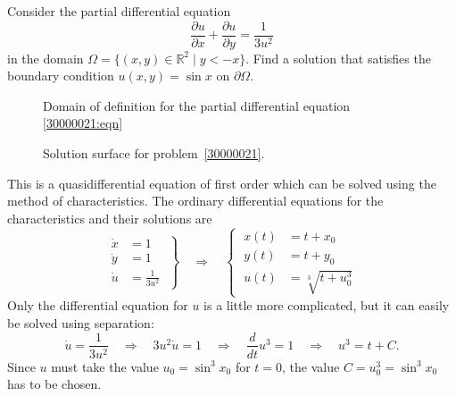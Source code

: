 Consider the partial differential equation
\begin{equation}
\frac{\partial u}{\partial x} + \frac{\partial u}{\partial y} = \frac{1}{3u^2}
\label{30000021:eqn}
\end{equation}
in the domain $\Omega = \{(x,y)\in\mathbb R^2\;|\; y<-x\}$. 
Find a solution that satisfies the boundary condition $u(x,y)=\sin x$ on
$\partial\Omega$.

\begin{loesung}
\begin{figure}
\centering
{}
\caption{Domain of definition for the partial differential equation
\eqref{30000021:eqn}
\label{3000021:domain}}
\end{figure}
\begin{figure}
\centering
{}
\caption{Solution surface for problem~\ref{30000021}.
\label{30000021:graph}}
\end{figure}
This is a quasidifferential equation of first order which can be solved
using the method of characteristics.
The ordinary differential equations for the characteristics and their
solutions are
\begin{equation}
\left.
\begin{aligned}
\dot x &= 1
\\
\dot y &= 1
\\
\dot u &= \frac1{3u^2}
\end{aligned}
\;
\right\}
\quad\Rightarrow\quad
\left\{
\;
\begin{aligned}
x(t) &= t + x_0
\\
y(t) &= t + y_0
\\
u(t) &=\sqrt[3]{t+u_0^3}
\end{aligned}
\right.
\label{30000020:char}
\end{equation}
Only the differential equation for $u$ is a little more complicated,
but it can easily be solved using separation:
\[
\dot{u}=\frac1{3u^2}
\quad\Rightarrow\quad
3u^2\dot u = 1
\quad\Rightarrow\quad
\frac{d}{dt}u^3=1
\quad\Rightarrow\quad
u^3 = t+C.
\]
Since $u$ must take the value $u_0=\sin^3x_0$ for $t=0$,
the value $C=u_0^3=\sin^3x_0$ has to be chosen.


\end{loesung}
